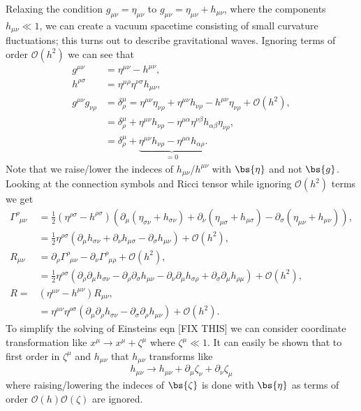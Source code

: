 Relaxing the condition $g_{\mu\nu}=\eta_{\mu\nu}$ to $g_{\mu\nu}=\eta_{\mu\nu}+h_{\mu\nu}$, where the components $h_{\mu\nu} \ll 1$, we can create a vacuum spacetime consisting of small curvature fluctuations; this turns out to describe gravitational waves. Ignoring terms of order $\mathcal{O}(h^2)$ we can see that
\begin{align}
g^{\mu\nu} &= \eta^{\mu\nu} - h^{\mu\nu}, \\
h^{\rho\sigma} &= \eta^{\mu\rho}\eta^{\nu\sigma}h_{\mu\nu},\\
g^{\mu\nu}g_{\nu\rho} &= \delta^\mu_\rho =\eta^{\mu\nu}\eta_{\nu\rho} +\eta^{\mu\nu}h_{\nu\rho} - h^{\mu\nu}\eta_{\nu\rho} + \mathcal{O}(h^2),\\
                      &= \delta^\mu_\rho +\eta^{\mu\nu}h_{\nu\rho} - \eta^{\mu\alpha}\eta^{\nu\beta} h_{\alpha\beta}\eta_{\nu\rho},\\
                      &= \delta^\mu_\rho +\underbrace{\eta^{\mu\nu}h_{\nu\rho} - \eta^{\mu\alpha} h_{\alpha\rho}}_{=0}.
\end{align}
Note that we raise/lower the indeces of $h_{\mu\nu}$/$h^{\mu\nu}$ with $\bs{\eta}$ and not $\bs{g}$. Looking at the connection symbols and Ricci tensor while ignoring $\mathcal{O}(h^2)$ terms we get
\begin{align}
\Gamma^{\rho}_{\,\,\,\mu\nu} &= \frac{1}{2}\left(\eta^{\rho\sigma}-h^{\rho\sigma}\right)\left( \partial_\mu(\eta_{\sigma\nu}+h_{\sigma\nu}) + \partial_\nu(\eta_{\mu\sigma}+h_{\mu\sigma})-\partial_\sigma(\eta_{\mu\nu}+h_{\mu\nu}) \right),\\
                             &=\frac{1}{2}\eta^{\rho\sigma}\left( \partial_\mu h_{\sigma\nu} + \partial_\nu h_{\mu\sigma}-\partial_\sigma h_{\mu\nu} \right) + \mathcal{O}(h^2),\\
                  R_{\mu\nu}& = \partial_{\rho}\Gamma^{\rho}_{\,\,\,\mu \nu}-\partial_{\nu}\Gamma^{\rho}_{\,\,\,\mu \rho} + \mathcal{O}(h^2),\\
                            & = \frac{1}{2}\eta^{\rho\sigma}\left( \partial_\rho \partial_\mu h_{\sigma\nu} - \partial_\rho \partial_\sigma h_{\mu\nu}  - \partial_\nu \partial_\mu h_{\sigma\rho} +  \partial_\sigma \partial_\mu h_{\rho\mu} \right) +\mathcal{O}(h^2),\\
                        R=& ({\eta^{\mu\nu}-h^{\mu\nu}})R_{\mu\nu},\\
                          &= \eta^{\mu\nu}\eta^{\rho\sigma}(\partial_\mu \partial_\rho h_{\sigma \nu} - \partial_\sigma \partial_\rho h_{\mu\nu}) +\mathcal{O}(h^2).
\end{align}
To simplify the solving of Einsteins eqn [FIX THIS] we can consider coordinate transformation like $x^\mu \rightarrow x^\mu + \zeta^\mu$ where $\zeta^\mu\ll1$. It can easily be shown that to first order in $\zeta^\mu$ and $h_{\mu\nu}$ that $h_{\mu\nu}$ transforms like 
\begin{equation}
h_{\mu\nu} \rightarrow h_{\mu\nu} + \partial_{\mu}\zeta_\nu + \partial_\nu \zeta_\mu
\end{equation} 
where raising/lowering the indeces of $\bs{\zeta}$ is done with $\bs{\eta}$ as terms of order $\mathcal{O}(h)\mathcal{O}(\zeta)$ are ignored.


